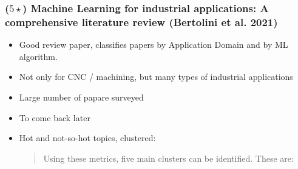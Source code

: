 \documentclass[
  letterpaper,
  DIV=11,
  numbers=noendperiod]{scrartcl}
\begin{document}
\hypertarget{star-machine-learning-for-industrial-applications-a-comprehensive-literature-review-bertolini2021}{%
\subsubsection{\texorpdfstring{(\(5\star\)) Machine Learning for
industrial applications: A comprehensive literature review (Bertolini et
al.
2021)}{(5\textbackslash star) Machine Learning for industrial applications: A comprehensive literature review (Bertolini et al. 2021)}}\label{star-machine-learning-for-industrial-applications-a-comprehensive-literature-review-bertolini2021}}

\begin{itemize}
\item
  Good review paper, classifies papers by Application Domain and by ML
  algorithm.
\item
  Not only for CNC / machining, but many types of industrial
  applications
\item
  Large number of papare surveyed
\item
  To come back later
\item
  Hot and not-so-hot topics, clustered:

  \begin{quote}
  Using these metrics, five main clusters can be identified. These are:


\end{quote}
\end{itemize}
\end{document}
